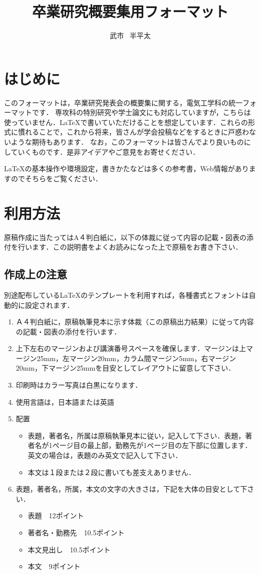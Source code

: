 \documentclass[a4j]{jarticle}
\title{卒業研究概要集用フォーマット}
\author{武市 ~半平太}
\begin{document}
\begin{Abstract}
 

\section{はじめに}
このフォーマットは，卒業研究発表会の概要集に関する，電気工学科の統一フォーマットです．
専攻科の特別研究や学士論文にも対応していますが，こちらは使っていません．{\LaTeX}で書いていただけることを想定しています．これらの形式に慣れることで，これから将来，皆さんが学会投稿などをするときに戸惑わないような期待もあります．
なお，このフォーマットは皆さんでより良いものにしていくものです．是非アイデアやご意見をお寄せください．

{\LaTeX}の基本操作や環境設定，書きかたなどは多くの参考書\cite{total}\cite{latex}\cite{okumura}，Web情報がありますのでそちらをご覧ください．

\section{利用方法}
原稿作成に当たってはA４判白紙に，以下の体裁に従って内容の記載・図表の添付を行います．この説明書をよくお読みになった上で原稿をお書き下さい．

\subsection{作成上の注意}
別途配布している{\LaTeX}のテンプレートを利用すれば，各種書式とフォントは自動的に設定されます．

\begin{enumerate}
  \item Ａ４判白紙に，原稿執筆見本に示す体裁（この原稿出力結果）に従って内容の記載・図表の添付を行います．
  \item 上下左右のマージンおよび講演番号スペースを確保します．マージンは上マージン25mm，左マージン20mm，カラム間マージン5mm，右マージン20mm，下マージン25mmを目安としてレイアウトに留意して下さい．
  \item 印刷時はカラー写真は白黒になります．
  \item 使用言語は，日本語または英語
  \item 配置
\begin{itemize}
  \item 	表題，著者名，所属は原稿執筆見本に従い，記入して下さい．表題，著者名が1ページ目の最上部，勤務先が1ページ目の左下部に位置します．英文の場合は，表題のみ英文で記入して下さい．
  \item 	本文は１段または２段に書いても差支えありません．
\end{itemize}
  \item 表題，著者名，所属，本文の文字の大きさは，下記を大体の目安として下さい．
\begin{itemize}
  \item 	表題　12ポイント
  \item 	著者名・勤務先　10.5ポイント
  \item 	本文見出し　10.5ポイント
  \item 	本文　9ポイント
\end{itemize}
\end{enumerate}


\end{Abstract}
\end{document}
